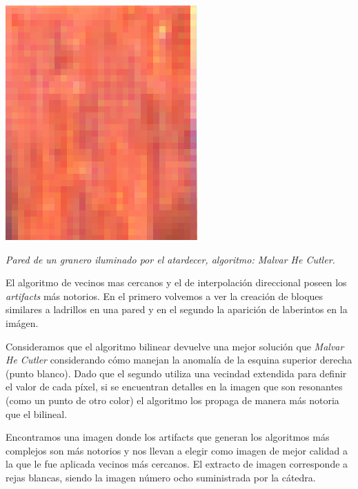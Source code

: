 	\begin{center}
		\includegraphics[scale=.5]{../enunciado/images_files/cualitativo/farm_malvar.png}
		\vspace{2pt}
		\par
		\footnotesize\textit{Pared de un granero iluminado por el atardecer, algoritmo: Malvar He Cutler.}
	\end{center}

El algoritmo de vecinos mas cercanos y el de interpolación direccional poseen los \textit{artifacts} más notorios. En el primero volvemos a ver la creación de bloques similares a ladrillos en una pared y en el segundo la aparición de laberintos en la imágen.

Consideramos que el algoritmo bilinear devuelve una mejor solución que \textit{Malvar He Cutler} considerando cómo manejan la anomalía de la esquina superior derecha (punto blanco). Dado que el segundo utiliza una vecindad extendida para definir el valor de cada píxel, si se encuentran detalles en la imagen que son resonantes (como un punto de otro color) el algoritmo los propaga de manera más notoria que el bilineal.

Encontramos una imagen donde los artifacts que generan los algoritmos más complejos son más notorios y nos llevan a elegir como imagen de mejor calidad a la que le fue aplicada vecinos más cercanos. El extracto de imagen corresponde a rejas blancas, siendo la imagen número ocho suministrada por la cátedra.


